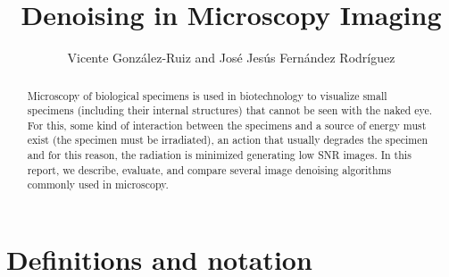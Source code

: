 \documentclass{article}
\title{Denoising in Microscopy Imaging}
\author{Vicente González-Ruiz and José Jesús Fernández Rodríguez}
\begin{document}
\maketitle

\begin{abstract}

  Microscopy of biological specimens is used in biotechnology to
  visualize small specimens (including their internal structures) that
  cannot be seen with the naked eye. For this, some kind of
  interaction between the specimens and a source of energy must exist
  (the specimen must be irradiated), an action that usually degrades
  the specimen and for this reason, the radiation is minimized
  generating low SNR images. In this report, we describe, evaluate,
  and compare several image denoising algorithms commonly used in
  microscopy.

\end{abstract}

\tableofcontents

\section*{Definitions and notation}
\end{document}
